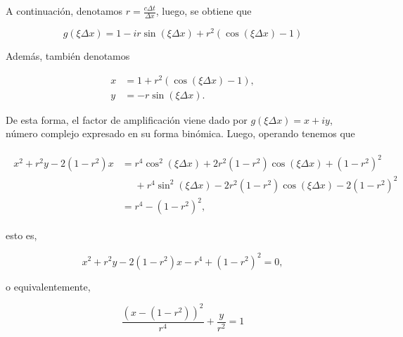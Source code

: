 \begin{example}
  A continuación, denotamos
  \begin{math}
    r=
    \frac{c\Delta t}{\Delta x}
  \end{math},
  luego, se obtiene que

  \begin{equation*}
    g
    \left(\xi\Delta x\right)=
    1-ir\sin
    \left(\xi\Delta x\right)+
    r^{2}
    \left(
    \cos
    \left(
      \xi\Delta x
      \right)-1
    \right)
  \end{equation*}

  Además, también denotamos

  \begin{align*}
    x & =
    1+
    r^{2}
    \left(
    \cos\left(\xi \Delta x\right)-
    1
    \right), \\
    y & =
    -r
    \sin
    \left(\xi\Delta x\right).
  \end{align*}

  De esta forma, el factor de amplificación viene dado por
  \begin{math}
    g\left(
    \xi\Delta x
    \right)=
    x+iy
  \end{math},
  número complejo expresado en su forma binómica.
  Luego, operando tenemos que

  \begin{gather*}
    \begin{split}
      x^{2}+
      r^{2}y-
      2\left(1-r^{2}\right)x
       & =
      r^{4}\cos^{2}
      \left(\xi\Delta x\right)+
      2r^{2}
      \left(1-r^{2}\right)
      \cos\left(\xi\Delta x\right)+
      {\left(1-r^{2}\right)}^{2}  \\
       & \phantom{=}
      +r^{4}
      \sin^{2}
      (\xi \Delta x)-
      2r^{2}
      \left(1-r^{2}\right)
      \cos\left(\xi\Delta x\right)-
      2{\left(1-r^{2}\right)}^{2} \\
       & =
      r^{4}-
      {\left(1-r^{2}\right)}^{2},
    \end{split}
  \end{gather*}

  esto es,

  \begin{equation*}
    x^{2}+
    r^{2}y-
    2\left(1-r^{2}\right)x-
    r^{4}+
    {\left(1-r^{2}\right)}^{2}=
    0,
  \end{equation*}

  o equivalentemente,

  \begin{equation}\label{eq:ellipse}
    \frac{{\left(x-\left(1-r^{2}\right)\right)}^{2}}{r^{4}}+
    \frac{y}{r^{2}}=
    1
  \end{equation}


\end{example}
